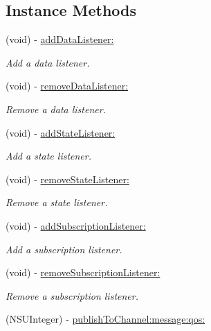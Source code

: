 \subsection*{Instance Methods}
\begin{DoxyCompactItemize}
\item 
(void) -\/ \hyperlink{protocol_x_i_messaging_01-p_a7883758cbf4e863c78367c5c8b46571a}{add\+Data\+Listener\+:}
\begin{DoxyCompactList}\small\item\em Add a data listener. \end{DoxyCompactList}\item 
(void) -\/ \hyperlink{protocol_x_i_messaging_01-p_a826157b38e443f4afdfed968648b1643}{remove\+Data\+Listener\+:}
\begin{DoxyCompactList}\small\item\em Remove a data listener. \end{DoxyCompactList}\item 
(void) -\/ \hyperlink{protocol_x_i_messaging_01-p_a010a800e4b356ec9f07ae64764c64b18}{add\+State\+Listener\+:}
\begin{DoxyCompactList}\small\item\em Add a state listener. \end{DoxyCompactList}\item 
(void) -\/ \hyperlink{protocol_x_i_messaging_01-p_a45b3e767df76eb04c7bc750f206b28c5}{remove\+State\+Listener\+:}
\begin{DoxyCompactList}\small\item\em Remove a state listener. \end{DoxyCompactList}\item 
(void) -\/ \hyperlink{protocol_x_i_messaging_01-p_aadf39a52055ddbd35e9bfc4ce0a84d72}{add\+Subscription\+Listener\+:}
\begin{DoxyCompactList}\small\item\em Add a subscription listener. \end{DoxyCompactList}\item 
(void) -\/ \hyperlink{protocol_x_i_messaging_01-p_a8e4b91527ad72342dfa47b67e33f9cde}{remove\+Subscription\+Listener\+:}
\begin{DoxyCompactList}\small\item\em Remove a subscription listener. \end{DoxyCompactList}\item 
(N\+S\+U\+Integer) -\/ \hyperlink{protocol_x_i_messaging_01-p_ae390588f0144835d7b2cac62c8968ef0}{publish\+To\+Channel\+:message\+:qos\+:}

\end{DoxyCompactItemize}

